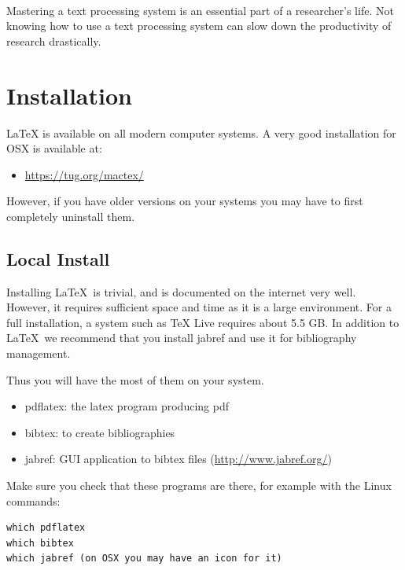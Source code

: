 \FILENAME\

Mastering a text processing system is an essential part of a
researcher's life. Not knowing how to use a text processing system can
slow down the productivity of research drastically.

\section{Installation}
\label{installation}

LaTeX is available on all modern computer systems. A very good
installation for OSX is available at:

\begin{itemize}
\item
  \url{https://tug.org/mactex/}
\end{itemize}


However, if you have older versions on your systems you may have to
first completely uninstall them.

\subsection{Local Install}\label{local-install}

Installing \LaTeX~is trivial, and is documented on the internet very
well. However, it requires sufficient space and time as it is a large
environment. For a full installation, a system such as TeX Live requires about 5.5
GB. In addition to \LaTeX~we recommend that you install jabref and use it
for bibliography management.

Thus you will have the most of them on your system.

\begin{itemize}

\item
  pdflatex: the latex program producing pdf
\item
  bibtex: to create bibliographies
\item
  jabref: GUI application to bibtex files (\url{http://www.jabref.org/})
\end{itemize}

Make sure you check that these programs are there, for example with the
Linux commands:

\begin{verbatim}
which pdflatex
which bibtex
which jabref (on OSX you may have an icon for it)
\end{verbatim}

